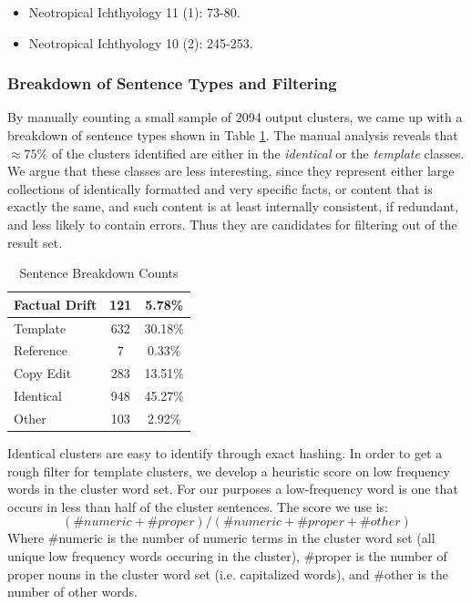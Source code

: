 \documentclass{acm_proc_article-sp}
\begin{document}
\begin{itemize}[noitemsep,nolistsep]
\item Neotropical Ichthyology 11 (1): 73-80.
\item Neotropical Ichthyology 10 (2): 245-253.
\end{itemize}

\subsubsection{Breakdown of Sentence Types and Filtering}

By manually counting a small sample of 2094 output clusters, we came up with a breakdown of sentence types shown in Table \ref{counts}. The manual analysis reveals that $\approx 75\%$ of the clusters identified are either in the \emph{identical} or the \emph{template} classes. We argue that these classes are less interesting, since they represent either large collections of identically formatted and very specific facts, or content that is exactly the same, and such content is at least internally consistent, if redundant, and less likely to contain errors. Thus they are candidates for filtering out of the result set.

\begin{table}
\centering
\caption{Sentence Breakdown Counts}
\begin{tabular}{| l | c | c |}
\hline
Factual Drift & 121 & 5.78\% \\ \hline
Template & 632 & 30.18\% \\ \hline
Reference & 7 & 0.33\% \\ \hline      
Copy Edit & 283 & 13.51\% \\ \hline
Identical & 948 & 45.27\% \\ \hline
Other & 103 & 2.92\% \\ \hline
\hline
\end{tabular}
\label{counts}
\end{table}

Identical clusters are easy to identify through exact hashing. In order to get a rough filter for template clusters, we develop a heuristic score on low frequency words in the cluster word set. For our purposes a low-frequency word is one that occurs in less than half of the cluster sentences. The score we use is:
\[(\#numeric + \#proper)/(\#numeric + \#proper + \#other)\]
Where \#numeric is the number of numeric terms in the cluster word set (all unique low frequency words occuring in the cluster), \#proper is the number of proper nouns in the cluster word set (i.e. capitalized words), and \#other is the number of other words.
\end{document}
